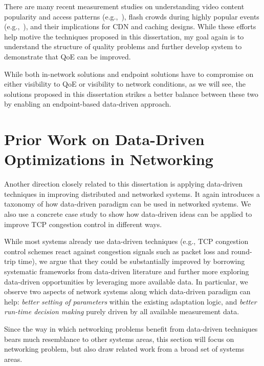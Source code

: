 There are many recent measurement studies on
understanding video content popularity and access patterns
(e.g.,~\cite{youtube-imc07}\cite{plissonneau2012longitudinal}), 
flash crowds during highly popular events (e.g.,~\cite{beijing-imc09}), 
and their implications for CDN and caching designs.  
While these efforts help motive the techniques proposed in 
this dissertation, my goal again is to understand the structure of 
quality problems and further develop system to demonstrate 
that QoE can be improved.

\vspace{0.5cm}
While both in-network solutions and endpoint solutions have 
to compromise on either visibility to QoE or visibility to network conditions,
as we will see, the solutions proposed in this dissertation 
strikes a better balance
between these two by enabling an endpoint-based data-driven approach.


\section{Prior Work on Data-Driven Optimizations in Networking}
\label{sec:related:data}

Another direction closely related to this 
dissertation is applying data-driven techniques in improving 
distributed and networked systems. 
It again introduces a taxonomy of how data-driven paradigm
can be used in networked systems.
We also use a concrete case study to show how data-driven ideas can
be applied to improve TCP congestion control in different ways. 

While most systems already use data-driven techniques 
(e.g., TCP congestion control schemes react against congestion 
signals such as packet loss and round-trip time),
we argue that they could be substantially
improved by borrowing systematic frameworks from data-driven
literature and further more exploring data-driven opportunities by
leveraging more available data.
In particular, we observe two aspects of network systems along 
which data-driven paradigm can help:
{\em better setting of parameters} within the existing adaptation logic,
and {\em better run-time decision making} purely driven by all
available measurement data.

Since the way in which networking problems benefit from data-driven 
techniques bears much resemblance to 
other systems areas, 
this section will focus on networking problem, but also draw 
related work from a broad set of systems areas.

